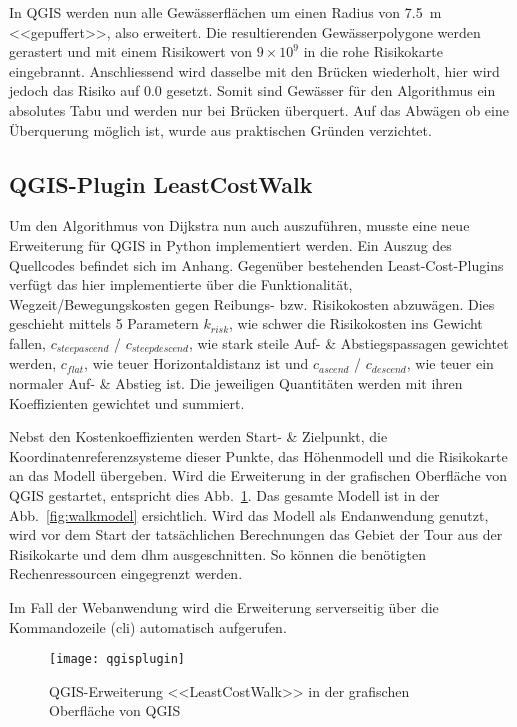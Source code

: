In QGIS werden nun alle Gewässerflächen um einen Radius von \qty{7.5}{m} <<gepuffert>>, also erweitert. Die resultierenden Gewässerpolygone werden gerastert und mit einem Risikowert von $9 \times 10^{9}$ in die rohe Risikokarte eingebrannt. Anschliessend wird dasselbe mit den Brücken wiederholt, hier wird jedoch das Risiko auf $0.0$ gesetzt. Somit sind Gewässer für den Algorithmus ein absolutes Tabu und werden nur bei Brücken überquert. Auf das Abwägen ob eine Überquerung möglich ist, wurde aus praktischen Gründen verzichtet.


\subsection{QGIS-Plugin LeastCostWalk}

Um den Algorithmus von Dijkstra nun auch auszuführen, musste eine neue Erweiterung für QGIS in Python implementiert werden. Ein Auszug des Quellcodes befindet sich im Anhang. Gegenüber bestehenden Least-Cost-Plugins verfügt das hier implementierte über die Funktionalität, Wegzeit/Bewegungskosten gegen Reibungs- bzw. Risikokosten abzuwägen. Dies geschieht mittels 5 Parametern $k_{risk}$, wie schwer die Risikokosten ins Gewicht fallen, $c_{steepascend}$ / $c_{steepdescend}$, wie stark steile Auf- \& Abstiegspassagen gewichtet werden, $c_{flat}$, wie teuer Horizontaldistanz ist und $c_{ascend}$ / $c_{descend}$, wie teuer ein normaler Auf- \& Abstieg ist. Die jeweiligen Quantitäten werden mit ihren Koeffizienten gewichtet und summiert.

Nebst den Kostenkoeffizienten werden Start- \& Zielpunkt, die Koordinatenreferenzsysteme dieser Punkte, das Höhenmodell und die Risikokarte an das Modell übergeben. Wird die Erweiterung in der grafischen Oberfläche von QGIS gestartet, entspricht dies Abb.\ \ref{fig:qgisplugin}. Das gesamte Modell ist in der Abb.\ \ref{fig:walkmodel} ersichtlich. Wird das Modell als Endanwendung genutzt, wird vor dem Start der tatsächlichen Berechnungen das Gebiet der Tour aus der Risikokarte und dem \acrshort{dhm} ausgeschnitten. So können die benötigten Rechenressourcen eingegrenzt werden.

Im Fall der Webanwendung wird die Erweiterung serverseitig über die Kommandozeile (\acrshort{cli}) automatisch aufgerufen.

\begin{figure}[H]
  \centering
  \texttt{[image: qgisplugin]}
  \caption{QGIS-Erweiterung <<LeastCostWalk>> in der grafischen Oberfläche von QGIS}\label{fig:qgisplugin}
\end{figure}

